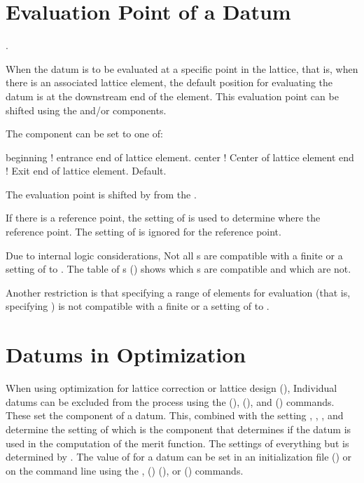 \section{Evaluation Point of a Datum}.
\label{s:dat.eval}

When the datum is to be evaluated at a specific point in the lattice, that is, when there
is an associated lattice element, the default position for evaluating the datum is at the
downstream end of the element. This evaluation point can be shifted using the
 and/or  components. 

The  component can be set to one of:
\begin{example}
  beginning   ! entrance end of lattice element.
  center      ! Center of lattice element
  end         ! Exit end of lattice element. Default.
\end{example}
The evaluation point is shifted by  from the .

If there is a reference point, the setting of  is used to determine where
the reference point. The setting of  is ignored for the reference point.

Due to internal logic considerations, Not all s are compatible with a finite
 or a setting of  to . The table of s
() shows which s are compatible and which are not.

Another restriction is that specifying a range of elements for evaluation (that is,
specifying  ) is not compatible with a finite
 or a setting of  to .

\section{Datums in Optimization}
\label{s:datum.opt}

When using optimization for lattice correction or lattice design (), Individual datums
can be excluded from the process using the  (), 
(), and  () commands. These set the  component of
a datum. This, combined with the setting , , , and
 determine the setting of  which is the component that determines if the
datum is used in the computation of the merit function. The settings of everything but
 is determined by \tao. The value of  for a datum can be set in an
initialization file () or on the command line using the , ()  (), or
 () commands.

